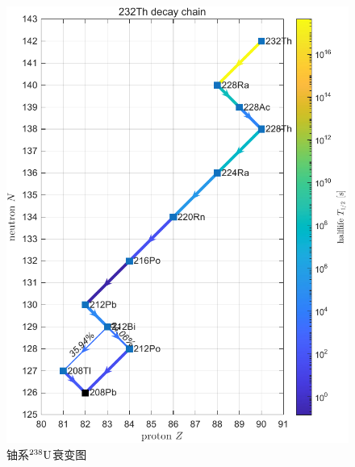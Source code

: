 \begin{figure}[hp]
	\centering
	\includegraphics[page=2]{figures/decay_system.pdf}
	\caption{铀系${^{238}\mathrm{U}}$衰变图}
	\label{fig:decay_system 238U}
\end{figure}

